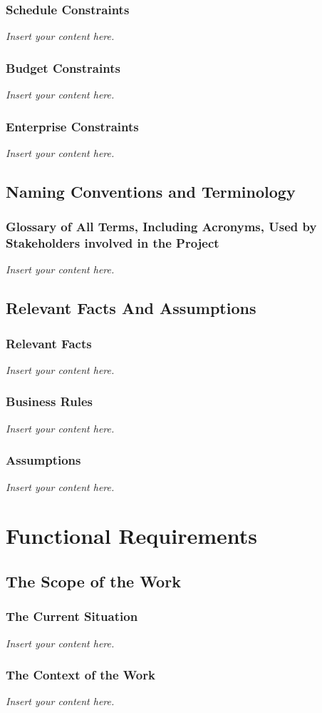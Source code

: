 \documentclass[12pt]{article}
\newcommand{\lips}{\textit{Insert your content here.}}
\begin{document}
\subsubsection{Schedule Constraints}
\lips
\subsubsection{Budget Constraints}
\lips
\subsubsection{Enterprise Constraints}
\lips

\subsection{Naming Conventions and Terminology}
\subsubsection{Glossary of All Terms, Including Acronyms, Used by Stakeholders
involved in the Project}
\lips

\subsection{Relevant Facts And Assumptions}
\subsubsection{Relevant Facts}
\lips
\subsubsection{Business Rules}
\lips
\subsubsection{Assumptions}
\lips

\section{Functional Requirements}
\subsection{The Scope of the Work}
\subsubsection{The Current Situation}
\lips
\subsubsection{The Context of the Work}
\lips
\end{document}
